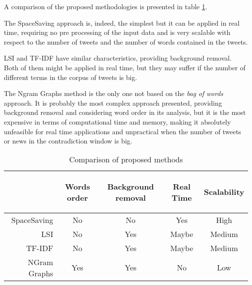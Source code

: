A comparison of the proposed methodologies is presented in table
\ref{tab:methComp}.

The SpaceSaving approach is, indeed, the simplest but it can be applied in real
time, requiring no pre processing of the input data and is very scalable with
respect to the number of tweets and the number of words contained in the tweets.

LSI and TF-IDF have similar characteristics, providing background removal. Both
of them might be applied in real time, but they may suffer if the number of
different terms in the corpus of tweets is big.

The Ngram Graphs method is the only one not based on the \emph{bag of words}
approach. It is probably the most complex approach presented, providing
background removal and considering word order in its analysis, but it is the most
expensive in terms of computational time and memory, making it absolutely unfeasible for
real time applications and unpractical when the number of tweets or news in the
contradiction window is big.

\begin{table}[htb]
	\centering
	\begin{tabular}{r|c|c|c|c}
		& \begin{sideways}Words order\end{sideways} & \begin{sideways}Background
			removal\end{sideways} & \begin{sideways}Real Time\end{sideways} &
				\begin{sideways}Scalability\end{sideways} \\
		\hline
		SpaceSaving & No & No & Yes & High \\
		LSI & No & Yes & Maybe & Medium \\
		TF-IDF & No & Yes & Maybe & Medium\\
		NGram Graphs & Yes & Yes & No & Low\\
		\end{tabular}
	\caption{Comparison of proposed methods}
	\label{tab:methComp}
\end{table}

